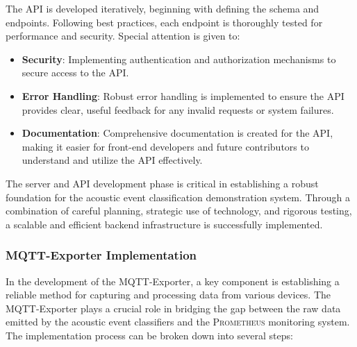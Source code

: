 The API is developed iteratively, beginning with defining the schema and endpoints. Following best practices, each endpoint is thoroughly tested for performance and security. Special attention is given to:

\begin{itemize}
  \item \textbf{Security}: Implementing authentication and authorization mechanisms to secure access to the API.
  \item \textbf{Error Handling}: Robust error handling is implemented to ensure the API provides clear, useful feedback for any invalid requests or system failures.
  \item \textbf{Documentation}: Comprehensive documentation is created for the API, making it easier for front-end developers and future contributors to understand and utilize the API effectively.
\end{itemize}

The server and API development phase is critical in establishing a robust foundation for the acoustic event classification demonstration system. Through a combination of careful planning, strategic use of technology, and rigorous testing, a scalable and efficient backend infrastructure is successfully implemented.

\subsubsection{MQTT-Exporter Implementation}

In the development of the MQTT-Exporter, a key component is establishing a reliable method for capturing and processing data from various devices. The MQTT-Exporter plays a crucial role in bridging the gap between the raw data emitted by the acoustic event classifiers and the \textsc{Prometheus} monitoring system. The implementation process can be broken down into several steps:

